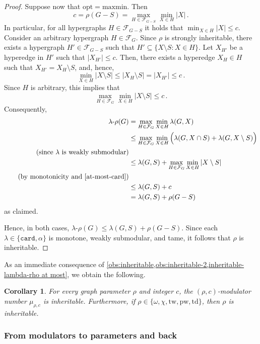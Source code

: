 \documentclass[11pt]{article}
\newcommand{\td}{\mathrm{td}}
\newcommand{\tw}{\mathrm{tw}}
\newcommand{\pw}{\mathrm{pw}}
\newcommand{\rhocm}{\mu_{\rho,c}}
\theoremstyle{plain}
\newtheorem{corollary}[theorem]{Corollary}
\theoremstyle{definition}
\theoremstyle{remark}
\numberwithin{equation}{section}
\begin{document}
\begin{proof}
Suppose now that $\mathrm{opt}= \mathrm{maxmin}$.
Then 
\[c = \rho(G-S) =\max_{H \in \mathcal{F}_{G-S}} \min_{X \in H} |X|\,.\]
In particular, for all hypergraphs $H \in \mathcal{F}_{G-S}$ it holds that $\min_{X \in H} |X| \le c$.
Consider an arbitrary hypergraph $H\in  \mathcal{F}_{G}$.
Since $\rho$ is strongly inheritable, there exists a hypergraph $H'\in \mathcal{F}_{G-S}$ such that $H'\subseteq \{X\setminus S\colon X\in H\}$.
Let $X_{H'}$ be a hyperedge in $H'$ such that $|X_{H'}|\le c$.
Then, there exists a hyperedge $X_H\in H$ such that $X_{H'} = X_H\setminus S$, and, hence,
\[\min_{X \in H} |X\setminus S|\le |X_H\setminus S| = |X_{H'}|\le c\,.\]
Since $H$ is arbitrary, this implies that 
\[\max_{H \in \mathcal{F}_{G}} \min_{X \in H} |X\setminus S| \le c\,.\]
Consequently, 
\begin{alignat*}{1}
\lambda\text{-}\rho(G) &= \max_{H \in \mathcal{F}_{G}} \min_{X \in H} \lambda(G,X)\\
&\le \max_{H \in \mathcal{F}_{G}} \min_{X \in H} \Big(\lambda(G,X \cap S) + \lambda(G,X\setminus S)\Big)\\ \tag*{\text{(since $\lambda$ is weakly submodular)}}\\
&\le \lambda(G,S) + \max_{H \in \mathcal{F}_{G}} \min_{X \in H} |X\setminus S|\\ \tag*{\text{(by monotonicity and \Cref{at-most-card})}}\\
&\le \lambda(G,S) +c\\
&= \lambda(G,S) + \rho(G-S)\,
\end{alignat*}
as claimed.

Hence, in both cases, $\lambda\text{-}\rho(G)\le \lambda(G,S) + \rho(G-S)$.
Since each $\lambda\in \{\mathtt{card},\alpha\}$ is  monotone, weakly submodular, and tame, it follows that $\rho$ is inheritable.
\end{proof}

As an immediate consequence of \cref{obs:inheritable,obs:inheritable-2,inheritable-lambda-rho at most}, we obtain the following.

\begin{corollary}\label{cor:inheritable}
For every graph parameter $\rho$ and integer $c$, the $(\rho,c)$-modulator number $\rhocm$ is inheritable.
Furthermore, if $\rho\in\{\omega,\chi,\tw,\pw,\td\}$, then $\rho$ is inheritable.
\end{corollary}

\subsubsection{From modulators to parameters and back}
\end{document}
